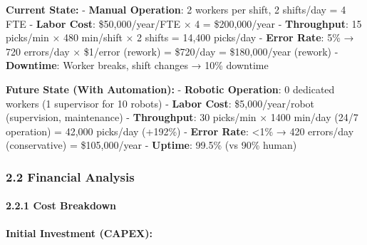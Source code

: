 \documentclass[
]{article}
\begin{document}
\textbf{Current State:} - \textbf{Manual Operation}: 2 workers per
shift, 2 shifts/day = 4 FTE - \textbf{Labor Cost}: \$50,000/year/FTE × 4
= \$200,000/year - \textbf{Throughput}: 15 picks/min × 480 min/shift × 2
shifts = 14,400 picks/day - \textbf{Error Rate}: 5\% → 720 errors/day ×
\$1/error (rework) = \$720/day = \$180,000/year (rework) -
\textbf{Downtime}: Worker breaks, shift changes → 10\% downtime

\textbf{Future State (With Automation):} - \textbf{Robotic Operation}: 0
dedicated workers (1 supervisor for 10 robots) - \textbf{Labor Cost}:
\$5,000/year/robot (supervision, maintenance) - \textbf{Throughput}: 30
picks/min × 1400 min/day (24/7 operation) = 42,000 picks/day (+192\%) -
\textbf{Error Rate}: \textless1\% → 420 errors/day (conservative) =
\$105,000/year - \textbf{Uptime}: 99.5\% (vs 90\% human)

\hypertarget{financial-analysis}{%
\subsubsection{2.2 Financial Analysis}\label{financial-analysis}}

\hypertarget{cost-breakdown}{%
\paragraph{2.2.1 Cost Breakdown}\label{cost-breakdown}}

\textbf{Initial Investment (CAPEX):}
\end{document}
